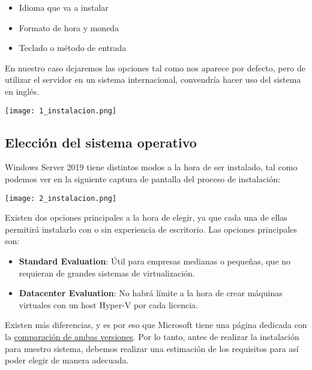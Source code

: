{
    \begin{minipage}{0.6\linewidth}
        \setlength{\parskip}{1.2em}
        \begin{itemize}
            \item Idioma que va a instalar
            \item Formato de hora y moneda
            \item Teclado o método de entrada
        \end{itemize}

        En nuestro caso dejaremos las opciones tal como nos aparece por defecto, pero de utilizar el servidor en un sistema internacional, convendría hacer uso del sistema en inglés.
    \end{minipage}
    \hfill
    \begin{minipage}{0.36\linewidth}
            \vspace{-11pt}
            \texttt{[image: 1\_instalacion.png]}
    \end{minipage}
}

\subsection{Elección del sistema operativo}
Windows Server 2019 tiene distintos modos a la hora de ser instalado, tal como podemos ver en la siguiente captura de pantalla del proceso de instalación:
\begin{center}
    \vspace{-10pt}
    \texttt{[image: 2\_instalacion.png]}
    \vspace{-15pt}
\end{center}

Existen dos opciones principales a la hora de elegir, ya que cada una de ellas permitirá instalarlo con o sin experiencia de escritorio. Las opciones principales son:

\begin{itemize}
    \item \textbf{Standard Evaluation}: Útil para empresas medianas o pequeñas, que no requieran de grandes sistemas de virtualización.
    \item \textbf{Datacenter Evaluation}: No habrá límite a la hora de crear máquinas virtuales con un host Hyper-V por cada licencia.
\end{itemize}

Existen más diferencias, y es por eso que Microsoft tiene una página dedicada con la \href{https://docs.microsoft.com/es-es/windows-server/get-started/editions-comparison-windows-server-2019}{comparación de ambas versiones}. Por lo tanto, antes de realizar la instalación para nuestro sistema, debemos realizar una estimación de los requisitos para así poder elegir de manera adecuada.


